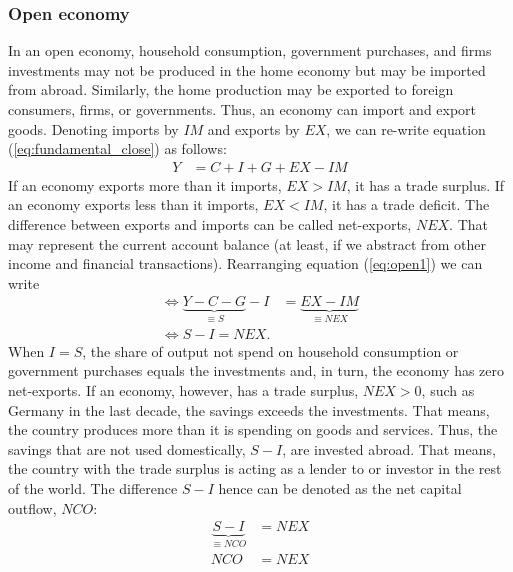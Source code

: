 \subsubsection*{Open economy}
In an open economy, household consumption, government purchases, and firms investments may not be produced in the home economy but may be imported from abroad. Similarly, the home production may be exported to foreign consumers, firms, or governments. Thus, an economy can import and export goods.
Denoting imports by $IM$ and exports by $EX$, we can re-write equation (\ref{eq:fundamental_close}) as follows:
\begin{align}
	Y&=C+I+G+EX-IM\label{eq:open1}
\end{align}
If an economy exports more than  it imports, $EX>IM$, it has a trade surplus. If  an economy exports less than it imports, $EX<IM$, it has a trade deficit. The difference between exports and imports can be called net-exports, $NEX$. That may represent the current account balance (at least, if we abstract from other income and financial transactions). Rearranging equation (\ref{eq:open1}) we can write
\begin{align}
	\Leftrightarrow	\underbrace{Y-C-G}_{\equiv S}-I&=\underbrace{EX-IM}_{\equiv NEX}\\
	\Leftrightarrow S-I=NEX.
\end{align}
When $I=S$, the share of output not spend on household consumption or government purchases equals the investments and, in turn, the economy has zero net-exports. If an economy, however, has a trade surplus, $NEX>0$, such as Germany in the last decade, the savings exceeds the investments. That means, the country produces more than it is spending on goods and services. Thus, the savings that are not used domestically, $S-I$, are invested abroad. That means, the country with the trade surplus is acting as a lender to or investor in the rest of the world.
The difference $S-I$ hence can be denoted as the net capital outflow, $NCO$:
\begin{align}
	\underbrace{S-I}_{\equiv NCO}&=NEX\\
	NCO&=NEX
\end{align}


